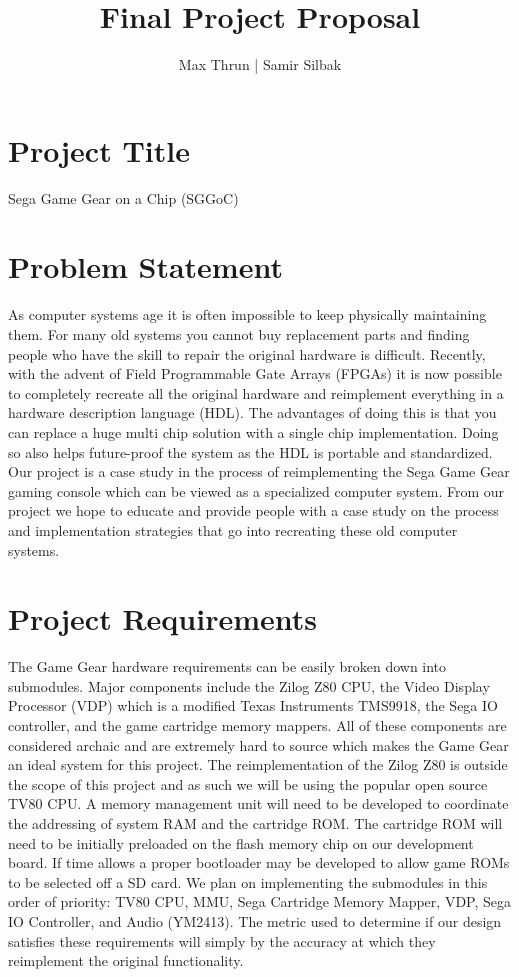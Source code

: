 \documentclass[11pt]{article}
\title{Final Project Proposal}
\author{ Max Thrun | Samir Silbak }
\begin{document}
\maketitle

\section*{Project Title}
Sega Game Gear on a Chip (SGGoC)

\section*{Problem Statement}
As computer systems age it is often impossible to keep physically maintaining them.
For many old systems you cannot buy replacement parts and finding people who have the skill
to repair the original hardware is difficult. Recently, with the advent of Field Programmable
Gate Arrays (FPGAs) it is now possible to completely recreate all the original hardware and reimplement
everything in a hardware description language (HDL). The advantages of doing this is that you can
replace a huge multi chip solution with a single chip implementation. Doing so also helps future-proof
the system as the HDL is portable and standardized. Our project is a case study in the process of
reimplementing the Sega Game Gear gaming console which can be viewed as a specialized computer system. 
From our project we hope to educate and provide people with a case study on the process and implementation 
strategies that go into recreating these old computer systems.

\section*{Project Requirements}
The Game Gear hardware requirements can be easily broken down into submodules. Major components include the Zilog Z80 CPU, 
the Video Display Processor (VDP) which is a modified Texas Instruments TMS9918, the Sega IO controller, and the
game cartridge memory mappers. All of these components are considered archaic and are extremely hard to source which makes
the Game Gear an ideal system for this project. The reimplementation of the Zilog Z80 is outside the scope of this project and as such
we will be using the popular open source TV80 CPU. A memory management unit will need to be developed to coordinate the 
addressing of system RAM and the cartridge ROM. The cartridge ROM will need to be initially preloaded on the flash memory chip on
our development board. If time allows a proper bootloader may be developed to allow game ROMs to be selected off a
SD card. We plan on implementing the submodules in this order of priority: TV80 CPU, MMU, Sega Cartridge Memory Mapper, VDP,
Sega IO Controller, and Audio (YM2413). The metric used to determine if our design satisfies these requirements will simply
by the accuracy at which they reimplement the original functionality.
\end{document}
